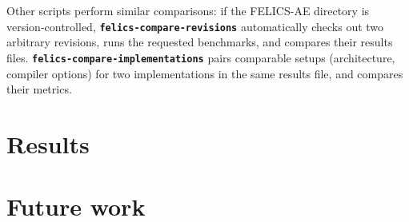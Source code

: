 \documentclass{article}
\begin{document}
Other scripts perform similar comparisons: if the FELICS-AE directory
is version-controlled, \textbf{\texttt{felics-compare-revisions}}
automatically checks out two arbitrary revisions, runs the requested
benchmarks, and compares their results files.
\textbf{\texttt{felics-compare-implementations}} pairs comparable
setups (architecture, compiler options) for two implementations in the
same results file, and compares their metrics.

\section{Results}
\label{sec:results}

\section{Future work}
\label{sec:future}



\end{document}
